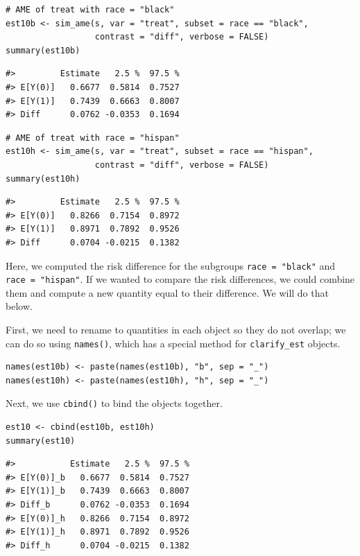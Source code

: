 \begin{verbatim}
# AME of treat with race = "black"
est10b <- sim_ame(s, var = "treat", subset = race == "black",
                  contrast = "diff", verbose = FALSE)
summary(est10b)
\end{verbatim}

\begin{verbatim}
#>         Estimate   2.5 %  97.5 %
#> E[Y(0)]   0.6677  0.5814  0.7527
#> E[Y(1)]   0.7439  0.6663  0.8007
#> Diff      0.0762 -0.0353  0.1694
\end{verbatim}

\begin{verbatim}
# AME of treat with race = "hispan"
est10h <- sim_ame(s, var = "treat", subset = race == "hispan",
                  contrast = "diff", verbose = FALSE)
summary(est10h)
\end{verbatim}

\begin{verbatim}
#>         Estimate   2.5 %  97.5 %
#> E[Y(0)]   0.8266  0.7154  0.8972
#> E[Y(1)]   0.8971  0.7892  0.9526
#> Diff      0.0704 -0.0215  0.1382
\end{verbatim}

Here, we computed the risk difference for the subgroups \texttt{race\ =\ "black"} and \texttt{race\ =\ "hispan"}. If we wanted to compare the risk differences, we could combine them and compute a new quantity equal to their difference. We will do that below.

First, we need to rename to quantities in each object so they do not overlap; we can do so using \texttt{names()}, which has a special method for \texttt{clarify\_est} objects.

\begin{verbatim}
names(est10b) <- paste(names(est10b), "b", sep = "_")
names(est10h) <- paste(names(est10h), "h", sep = "_")
\end{verbatim}

Next, we use \texttt{cbind()} to bind the objects together.

\begin{verbatim}
est10 <- cbind(est10b, est10h)
summary(est10)
\end{verbatim}

\begin{verbatim}
#>           Estimate   2.5 %  97.5 %
#> E[Y(0)]_b   0.6677  0.5814  0.7527
#> E[Y(1)]_b   0.7439  0.6663  0.8007
#> Diff_b      0.0762 -0.0353  0.1694
#> E[Y(0)]_h   0.8266  0.7154  0.8972
#> E[Y(1)]_h   0.8971  0.7892  0.9526
#> Diff_h      0.0704 -0.0215  0.1382
\end{verbatim}

